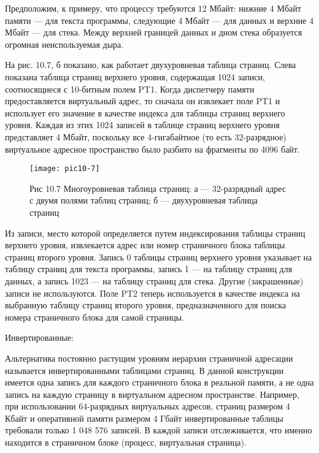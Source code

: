 \begin{example}
  Предположим, к примеру, что процессу требуются 12 Мбайт: нижние 4 Мбайт памяти — для текста программы, следующие 4 Мбайт — для данных и верхние 4 Мбайт — для стека. Между верхней границей данных и дном стека образуется огромная неиспользуемая дыра.
\end{example}

На рис. 10.7, б показано, как работает двухуровневая таблица страниц. Слева показана таблица страниц верхнего уровня, содержащая 1024 записи, соотносящиеся с 10-битным полем PT1. Когда диспетчеру памяти предоставляется виртуальный адрес, то сначала он извлекает поле PT1 и использует его значение в качестве индекса для таблицы страниц верхнего уровня. Каждая из этих 1024 записей в таблице страниц верхнего уровня представляет 4 Мбайт, поскольку все 4-гигабайтное (то есть 32-разрядное) виртуальное адресное пространство было разбито на фрагменты по 4096 байт.

\begin{figure}
  \begin{center}
  \texttt{[image: pic10-7]}
  \caption{Рис 10.7 Многоуровневая таблица страниц: а — 32-разрядный адрес с двумя полями таблиц страниц; б — двухуровневая таблица страниц}
  \end{center}
\end{figure}

\newpage
Из записи, место которой определяется путем индексирования таблицы страниц верхнего уровня, извлекается адрес или номер страничного блока таблицы страниц второго уровня. Запись 0 таблицы страниц верхнего уровня указывает на таблицу страниц для текста программы, запись 1 — на таблицу страниц для данных, а запись 1023 — на таблицу страниц для стека. Другие (закрашенные) записи не используются. Поле PT2 теперь используется в качестве индекса на выбранную таблицу страниц второго уровня, предназначенного для поиска номера страничного блока для самой страницы.

Инвертированные:

Альтернатива постоянно растущим уровням иерархии страничной адресации называется инвертированными таблицами страниц. В данной конструкции имеется одна запись для каждого страничного блока в реальной памяти, а не одна запись на каждую страницу в виртуальном адресном пространстве. Например, при использовании 64-разрядных виртуальных адресов, страниц размером 4 Кбайт и оперативной памяти размером 4 Гбайт инвертированные таблицы требовали только 1 048 576 записей. В каждой записи отслеживается, что именно находится в страничном блоке (процесс, виртуальная страница).

